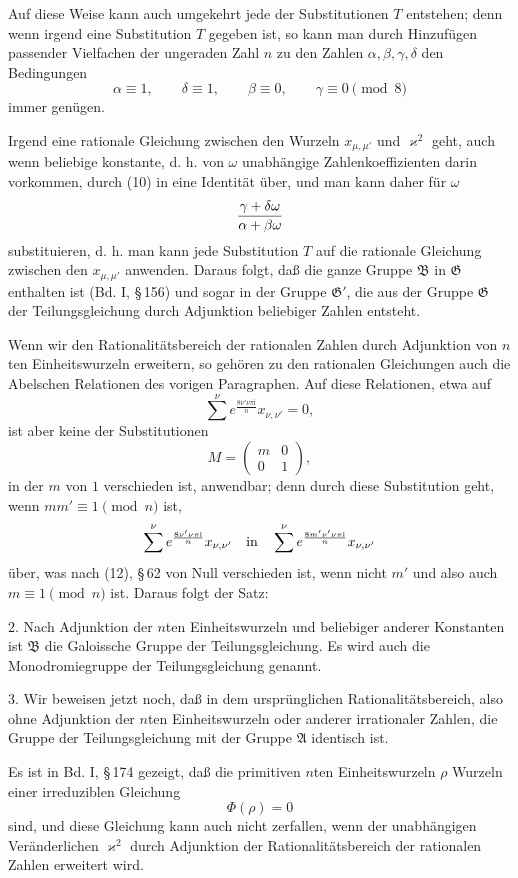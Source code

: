 \documentclass[11pt]{article}
\providecommand{\ii}{\mathrm{i}}
\begin{document}
Auf diese Weise kann auch umgekehrt jede der Substitutionen $T$ entstehen; denn wenn
irgend eine Substitution $T$ gegeben ist, so kann man durch Hinzufügen passender
Vielfachen der ungeraden Zahl $n$ zu den Zahlen $\alpha,\beta,\gamma,\delta$ den Bedingungen
\[
 \alpha\equiv1,
 \qquad \delta\equiv1,
 \qquad \beta\equiv0,
 \qquad \gamma\equiv0\pmod 8
\]
immer genügen.

Irgend eine rationale Gleichung zwischen den Wurzeln $x_{\mu,\mu'}$ und $\varkappa^2$
geht, auch wenn beliebige konstante, d. h. von $\omega$ unabhängige Zahlenkoeffizienten
darin vorkommen, durch (10) in eine Identität über, und man kann daher für $\omega$
\[
 {\gamma+\delta\omega\over\alpha+\beta\omega}
\]
substituieren, d. h. man kann jede Substitution $T$ auf die rationale Gleichung zwischen
den $x_{\mu,\mu'}$ anwenden. Daraus folgt, daß die ganze Gruppe $\mathfrak B$ in
$\mathfrak G$ enthalten ist (Bd. I, \S\,156) und sogar in der Gruppe $\mathfrak G'$, die aus der
Gruppe $\mathfrak G$ der Teilungsgleichung durch Adjunktion beliebiger Zahlen entsteht.

Wenn wir den Rationalitätsbereich der rationalen Zahlen durch Adjunktion von $n$ten
Einheitswurzeln erweitern, so gehören zu den rationalen Gleichungen auch die Abelschen
Relationen des vorigen Paragraphen. Auf diese Relationen, etwa auf
\[
 \sum^\nu e^{\frac{8\nu'\nu\pi \ii}{n}}x_{\nu,\nu'}=0,
\]
ist aber keine der Substitutionen
\[
 M=\begin{pmatrix}m&0\\0&1\end{pmatrix},
\]
in der $m$ von $1$ verschieden ist, anwendbar; denn durch diese Substitution geht, wenn
$mm'\equiv1\pmod n$ ist,
\[
 \sum^\nu e^{\frac{8\nu'\nu\pi \ii}{n}}x_{\nu,\nu'}
 \quad\hbox{in}\quad
 \sum^\nu e^{\frac{8m'\nu'\nu\pi \ii}{n}}x_{\nu,\nu'}
\]
über, was nach (12), \S\,62 von Null verschieden ist, wenn nicht $m'$ und also auch
$m\equiv1\pmod n$ ist. Daraus folgt der Satz:

2. Nach Adjunktion der $n$ten Einheitswurzeln und beliebiger anderer Konstanten ist
$\mathfrak B$ die Galoissche Gruppe der Teilungsgleichung. Es wird auch die
Monodromiegruppe der Teilungsgleichung genannt.

3. Wir beweisen jetzt noch, daß in dem ursprünglichen Rationalitätsbereich, also ohne
Adjunktion der $n$ten Einheitswurzeln oder anderer irrationaler Zahlen, die Gruppe der
Teilungsgleichung mit der Gruppe $\mathfrak A$ identisch ist.

Es ist in Bd. I, \S\,174 gezeigt, daß die primitiven $n$ten Einheitswurzeln $\rho$ Wurzeln
einer irreduziblen Gleichung
\begin{equation}
 \Phi(\rho)=0
\tag{12}
\end{equation}
sind, und diese Gleichung kann auch nicht zerfallen, wenn der unabhängigen Veränderlichen
$\varkappa^2$ durch Adjunktion der Rationalitätsbereich der rationalen Zahlen erweitert wird.
\end{document}

